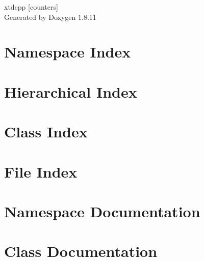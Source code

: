 \documentclass[twoside]{book}
\newcommand{\+}{\discretionary{\mbox{\scriptsize$\hookleftarrow$}}{}{}}
\newcommand{\clearemptydoublepage}{%
  \newpage{\pagestyle{empty}\cleardoublepage}%
}
\begin{document}
\hypersetup{pageanchor=false,
             bookmarksnumbered=true,
             pdfencoding=unicode
            }
\begin{titlepage}
\vspace*{7cm}
\begin{center}%
{\Large xtdcpp \mbox{[}counters\mbox{]} }\\
\vspace*{1cm}
{\large Generated by Doxygen 1.8.11}\\
\end{center}
\end{titlepage}
\clearemptydoublepage
\tableofcontents
\clearemptydoublepage
{}
\hypersetup{pageanchor=true}

\chapter{Namespace Index}

\chapter{Hierarchical Index}

\chapter{Class Index}

\chapter{File Index}

\chapter{Namespace Documentation}


\chapter{Class Documentation}

















\end{document}
